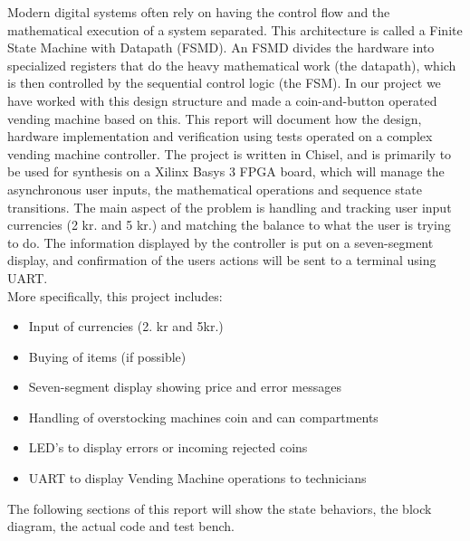 

Modern digital systems often rely on having the control flow and the mathematical execution of a system separated. This architecture is called a Finite State Machine with Datapath (FSMD). An FSMD divides the hardware into specialized registers that do the heavy mathematical work (the datapath), which is then controlled by the sequential control logic (the FSM). 
In our project we have worked with this design structure and made a coin-and-button operated vending machine based on this.
This report will document how the design, hardware implementation and verification using tests operated on a complex vending machine controller. The project is written in Chisel, and is primarily to be used for synthesis on a Xilinx Basys 3 FPGA board, which will manage the asynchronous user inputs, the mathematical operations and sequence state transitions.
The main aspect of the problem is handling and tracking user input currencies (2 kr. and 5 kr.) and matching the balance to what the user is trying to do. The information displayed by the controller is put on a seven-segment display, and confirmation of the users actions will be sent to a terminal using UART.\\
More specifically, this project includes:
\begin{itemize}
    \item Input of currencies (2. kr and 5kr.)
    \item Buying of items (if possible)
    \item Seven-segment display showing price and error messages
    \item Handling of overstocking machines coin and can compartments
    \item LED's to display errors or incoming rejected coins
    \item UART to display Vending Machine operations to technicians
\end{itemize}
The following sections of this report will show the state behaviors, the block diagram, the actual code and test bench. 